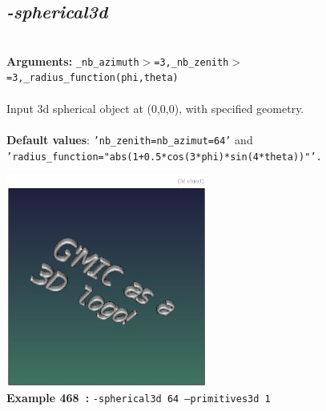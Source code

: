 \documentclass[a4paper,11pt,twoside]{book}
\begin{document}
\subsection{\emph{-spherical3d} }\vspace*{-0.5em}
~\\\textbf{Arguments: } 
{\small \texttt{\_nb\_azimuth$>$=3,\_nb\_zenith$>$=3,\_radius\_function(phi,theta)}}\\~\\
Input 3d spherical object at (0,0,0), with specified geometry.
~\\~\\\textbf{Default values}: {\small \texttt{'nb\_zenith=nb\_azimut=64'} and \texttt{'radius\_function="abs(1+0.5*cos(3*phi)*sin(4*theta))"'.}}
\begin{center}\includegraphics[keepaspectratio=true,height=7cm,width=\textwidth]{img/gmic_def468.jpg}\\
{\footnotesize \textbf{Example 468~:} \texttt{-spherical3d 64 --primitives3d 1}}
\end{center}
\end{document}
